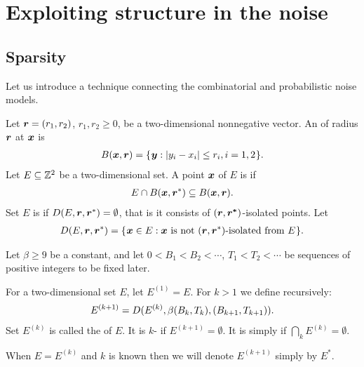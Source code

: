 \documentclass[12pt]{memoir}
\renewcommand{\le}{\leq}
\renewcommand{\ge}{\geq}
\def\B{B}
\newcommand{\Tu}{T}
\newcommand{\Z}{Z}
\begin{document}


\section{Exploiting structure in the noise}\label{sec:noise}

\subsection{Sparsity}\label{sec:sparsity}
Let us introduce a technique connecting the combinatorial and probabilistic
noise models.

\begin{definition}
Let \( \boldsymbol{r}=(r_1,r_2) \), \( r_1, r_2\ge 0 \),
be a two-dimensional nonnegative vector.
An  of radius \( \boldsymbol{r} \)  at \( \boldsymbol{x} \) is
\begin{align}\label{eq:ball1}
  B(\vek{x},\vek{r}) = \setOf{\vek{y}}{\abs{y_i - x_i} \le r_i, i=1,2}.
\end{align}  
Let \( E\subseteq \mathbb{Z}^{2} \) be a two-dimensional set.
A point \( \boldsymbol{x} \) of \( E \) is  if
\begin{align*}
  E \cap B(\boldsymbol{x},\boldsymbol{r}^*)\subseteq B(\boldsymbol{x}, \boldsymbol{r}).
 \end{align*}
Set \( E \) is  
if \( D(E, \boldsymbol{r}, \boldsymbol{r}^*)=\emptyset \), that is 
it consists of \( (\boldsymbol{r}, \boldsymbol{r^*}) \)-isolated points.
Let
\begin{align}
  D(E,\boldsymbol{r}, \boldsymbol{r}^*) =
     \mathopen\{\mskip 1mu\boldsymbol{x}\in E : \boldsymbol{x} \text{\rmfamily\mdseries\upshape{ is not }} (\boldsymbol{r}, \boldsymbol{r}^*)\text{\rmfamily\mdseries\upshape{-isolated
  from }} E\mskip 1mu\mathclose\}.
\end{align}
\end{definition}

\begin{definition}[Sparsity]\label{def:sparsity}
Let \( \beta\ge 9 \) be a constant, and let 
\( 0<\B_{1}<\B_{2}<\dotsm \), \( \Tu_{1}<\Tu_{2}<\dotsm \) be 
sequences of positive integers to be fixed later.

For a two-dimensional set \( E \), let \( E^{(1)} = E \).
For \( k>1 \) we define recursively:
\begin{align}\label{eq:noise^k}
    E^{(k+1)} = D(E^{(k)}, \beta\pair{\B_k}{\Tu_{k}}, \pair{\B_{k+1}}{\Tu_{k+1}}).
\end{align}
Set \( E^{(k)} \) is called the  of \( E \).
It is \( k \)- if \( E^{(k+1)}=\emptyset \).
It is simply  if \( \bigcap_{k}E^{(k)}=\emptyset \).

When \( E=E^{(k)} \) and \( k \) is known
then we will denote \( E^{(k+1)} \) simply by \( E^{*} \).
\end{definition}
\end{document}
